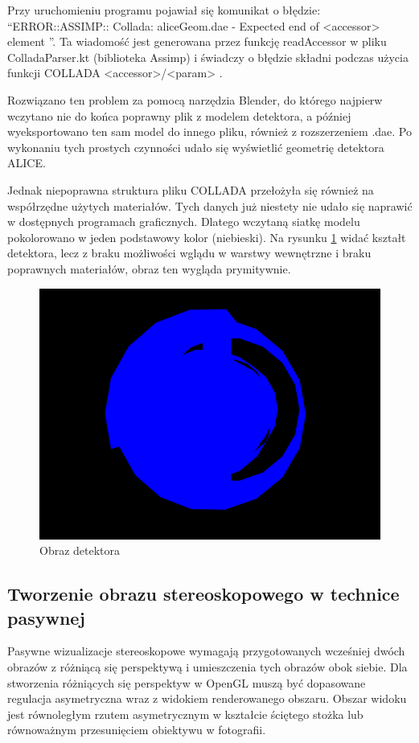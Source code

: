 Przy uruchomieniu programu pojawiał się komunikat o błędzie: \textquotedblleft ERROR::ASSIMP:: Collada: aliceGeom.dae - Expected end of <accessor> element \textquotedblright . Ta wiadomość jest generowana przez funkcję readAccessor w pliku ColladaParser.kt (biblioteka Assimp) i świadczy o błędzie składni podczas użycia funkcji COLLADA <accessor>/<param> \cite{collada}.

Rozwiązano ten problem za pomocą narzędzia Blender, do którego najpierw wczytano nie do końca poprawny plik z modelem detektora, a później wyeksportowano ten sam model do innego pliku, również z rozszerzeniem .dae. Po wykonaniu tych prostych czynności udało się wyświetlić geometrię detektora ALICE.

Jednak niepoprawna struktura pliku COLLADA przełożyła się również na współrzędne użytych materiałów. Tych danych już niestety nie udało się naprawić w dostępnych programach graficznych. Dlatego wczytaną siatkę modelu pokolorowano w jeden podstawowy kolor (niebieski). Na rysunku \ref{rys28} widać kształt detektora, lecz z braku możliwości wglądu w warstwy wewnętrzne i braku poprawnych materiałów, obraz ten wygląda prymitywnie.

\begin{figure}[H]
		\centering
 		\includegraphics[width=12.0cm]{myGeom.png}
    	\caption{Obraz detektora}
 		\label{rys28}
\end{figure}

\subsection{Tworzenie obrazu stereoskopowego w technice pasywnej}
Pasywne wizualizacje stereoskopowe wymagają przygotowanych wcześniej dwóch obrazów z różniącą się perspektywą i umieszczenia tych obrazów obok siebie. Dla stworzenia różniących się perspektyw w OpenGL muszą być dopasowane regulacja asymetryczna wraz z widokiem renderowanego obszaru. Obszar widoku jest równoległym rzutem asymetrycznym w kształcie ściętego stożka lub równoważnym przesunięciem obiektywu w fotografii.

